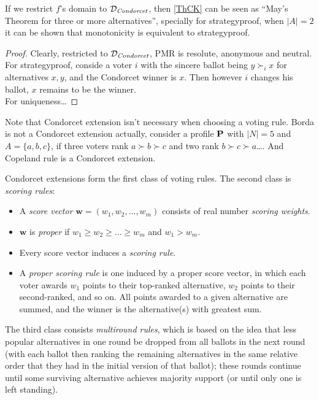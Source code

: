 If we restrict $f$'s domain to $\mathcal{D}_\textit{Condorcet}$, then \cref{ThCK} can be seen as “May's Theorem for three or more alternatives”, specially for strategyproof, when $|A| = 2$ it can be shown that monotonicity is equivalent to strategyproof.

\begin{proof}
    Clearly, restricted to $\mathcal{D}_\textit{Condorcet}$, PMR is resolute, anonymous and neutral. For strategyproof, conside a voter $i$ with the sincere ballot being $y \succ_i x$ for alternatives $x,y$, and the Condorcet winner is $x$. Then however $i$ changes his ballot, $x$ remains to be the winner.\\
    For uniqueness\dots
\end{proof}

Note that Condorcet extension isn't necessary when choosing a voting rule. Borda is not a Condorcet extension actually, consider a profile $\mathbf{P}$ with $|N| = 5$ and $A = \{a,b,c\}$, if three voters rank $a \succ b \succ c$ and two rank $b \succ c \succ a$\dots. And Copeland rule is a Condorcet extension.

Condorcet extensions form the first class of voting rules. The second class is \textit{scoring rules}:

\begin{definition}
    \label{scoring_rule}
    \begin{itemize}
        \item A \textit{score vector} $\mathbf{w} = (w_1,w_2,\dots,w_m)$ consists of real number \textit{scoring weights}. 
        \item $\mathbf{w}$ is \textit{proper} if $w_1 \geq w_2 \geq \dots \geq w_m$ and $w_1 > w_m$.
        \item Every score vector induces a \emph{scoring rule}.
        \item A \textit{proper scoring rule} is one induced by a proper score vector, in which each voter awards $w_1$ points to their top-ranked alternative, $w_2$ points to their second-ranked, and so on. All points awarded to a given alternative are summed, and the winner is the alternative(s) with greatest sum.
    \end{itemize}
\end{definition}

\label{run-off}
The third class consists \textit{multiround rules}, which is based on the idea that less popular alternatives in one round be dropped from all ballots in the next round (with each ballot then ranking the remaining alternatives in the same relative order that they had in the initial version of that ballot); these rounds continue until some surviving alternative achieves majority support (or until only one is left standing).

